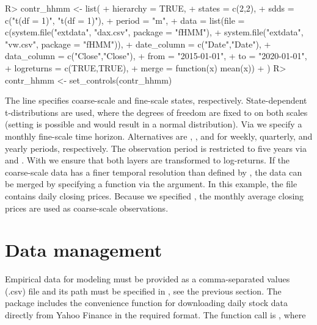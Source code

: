 \documentclass[article]{jss}
\newcommand{\fct}[1]{\code{#1()}}
\begin{document}
%
\begin{Schunk}
\begin{Sinput}
R> contr_hhmm <- list(
+    hierarchy = TRUE,
+    states    = c(2,2),
+    sdds      = c("t(df = 1)", "t(df = 1)"),
+    period    = "m",
+    data      = list(file = c(system.file("extdata", "dax.csv", package = "fHMM"),
+                              system.file("extdata", "vw.csv", package = "fHMM")),
+                     date_column = c("Date","Date"),
+                     data_column = c("Close","Close"),
+                     from = "2015-01-01",
+                     to = "2020-01-01",
+                     logreturns = c(TRUE,TRUE),
+                     merge = function(x) mean(x))
+  )
R> contr_hhmm <- set_controls(contr_hhmm)
\end{Sinput}
\end{Schunk}
%

The line  specifies  coarse-scale and  fine-scale states, respectively. State-dependent t-distributions are used, where the degrees of freedom are fixed to  on both scales (setting  is possible and would result in a normal distribution). Via  we specify a monthly fine-scale time horizon. Alternatives are , , and  for weekly, quarterly, and yearly periods, respectively. The observation period is restricted to five years via  and . With  we ensure that both layers are transformed to log-returns. If the coarse-scale data has a finer temporal resolution than defined by , the data can be merged by specifying a function via the  argument. In this example, the file  contains daily closing prices. Because we specified , the monthly average closing prices are used as coarse-scale observations.

\section{Data management} \label{sec:data_management} %

Empirical data for modeling must be provided as a comma-separated values (.csv) file and its path must be specified in \fct{set\_controls}, see the previous section. The package includes the convenience function \fct{download\_data} for downloading daily stock data directly from Yahoo Finance in the required format. The function call is , where
\end{document}
